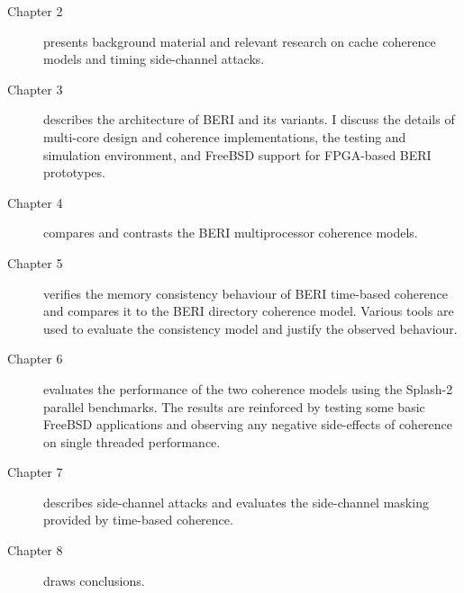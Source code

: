 		\begin{description}
			\item [Chapter 2] presents background material and relevant research on cache coherence models and timing side-channel attacks.
			\item [Chapter 3] describes the architecture of BERI and its variants. I discuss the details of multi-core design and coherence implementations, the testing and simulation environment, and FreeBSD support for FPGA-based BERI prototypes.
			\item [Chapter 4] compares and contrasts the BERI multiprocessor coherence models.
			\item [Chapter 5] verifies the memory consistency behaviour of BERI time-based coherence and compares it to the BERI directory coherence model. Various tools are used to evaluate the consistency model and justify the observed behaviour.
			\item [Chapter 6] evaluates the performance of the two coherence models using the Splash-2 parallel benchmarks. The results are reinforced by testing some basic FreeBSD applications and observing any negative side-effects of coherence on single threaded performance.
			\item [Chapter 7] describes side-channel attacks and evaluates the side-channel masking provided by time-based coherence.
			\item [Chapter 8] draws conclusions.
		\end{description}

